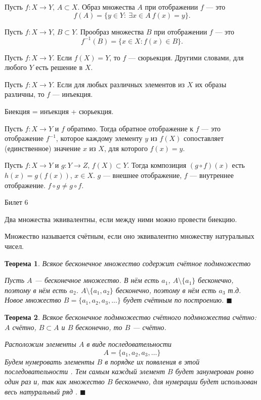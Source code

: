 \documentclass[12pt,a4paper]{article}
\newtheorem*{theorem*}{Теорема}
\begin{document}
Пусть $f: X \rightarrow Y$, $A \subset X$. Образ множества $A$ при отображении $f$ --- это $$f(A)=\{y \in Y:\ \exists x \in A\ f(x)=y\}.$$

Пусть $f: X \rightarrow Y$, $B \subset Y$. Прообраз множества $B$ при отображении $f$ --- это $$f^{-1}(B)=\{x \in X: f(x) \in B\} .$$

Пусть $f: X \rightarrow Y$. Если $f(X) = Y$, то $f$ --- сюрьекция. Другими словами, для любого $Y$ есть решение в $X$.

Пусть $f: X \rightarrow Y$. Если для любых различных элементов из $X$ их образы различны, то $f$ --- инъекция.

Биекция = инъекция + сюрьекция.

Пусть $f: X \rightarrow Y$ и $f$ обратимо. Тогда обратное отображение к $f$ --- это отображение $f^{-1}$, которое каждому элементу $y$ из $f(X)$ сопоставляет (единственное) значение $x$ из $X$, для которого $f(x)=y$.

Пусть $f: X \rightarrow Y$ и $g: Y \rightarrow Z$, $f(X) \subset Y$. Тогда композиция $(g \circ f)(x)$ есть $h(x) = g(f(x))$, $x \in X$. $g$ --- внешнее отображение, $f$ --- внутреннее отображение. $f \circ g \ne g \circ f$.

\begin{center}
Билет 6
\end{center}

Два множества эквивалентны, если между ними можно провести биекцию.

Множество называется счётным, если оно эквивалентно множеству натуральных чисел.

\begin{theorem*}
\label{6.1}
Всякое бесконечное множество содержит счётное подмножество

Пусть $A$ --- бесконечное множество. В нём есть $a_1$, $A \setminus \{a_1\}$ бесконечно, поэтому в нём есть $a_2$. $A \setminus \{a_1, a_2\}$ бесконечно, поэтому в нём есть $a_3$  т.д. Новое множество $B = \{a_1, a_2, a_3, ...\}$ будет счётным по построению. $\blacksquare$
\end{theorem*}

\begin{theorem*}
\label{6.2}
Всякое бесконечное подмножество счётного подмножества счётно: $A$ счётно, $B \subset A$ и $B$ бесконечно, то $B$ --- счётно.

Расположим элементы $A$ в виде последовательности
$$
A = \{ a_1, a_2, a_3, \ldots \}
$$
Будем нумеровать элементы $B$ в порядке их появления в этой последовательности . Тем самым каждый элемент $B$ будет занумерован ровно один раз и, так как множество $B$ бесконечно, для нумерации будет использован весь натуральный ряд . $\blacksquare$
\end{theorem*}
\end{document}
